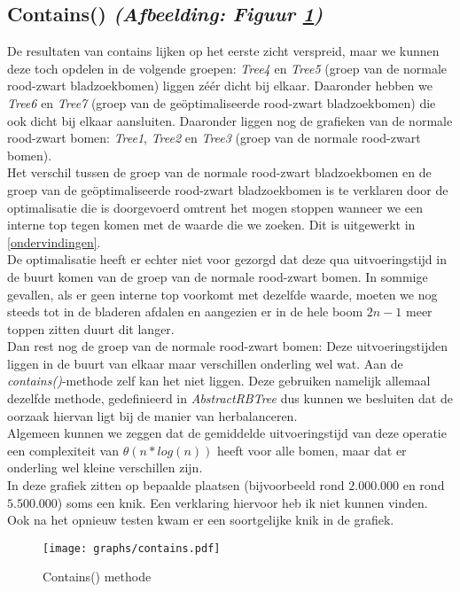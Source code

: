 \documentclass[11pt,a4paper]{report}
\begin{document}
\subsection{Contains() \textsl{(Afbeelding: Figuur \ref{contains})}}
De resultaten van contains lijken op het eerste zicht verspreid, maar we kunnen deze toch opdelen in de volgende groepen: \textsl{Tree4} en \textsl{Tree5} (groep van de normale rood-zwart bladzoekbomen) liggen z\'e\'er dicht bij elkaar. Daaronder hebben we \textsl{Tree6} en \textsl{Tree7} (groep van de ge\"optimaliseerde rood-zwart bladzoekbomen) die ook dicht bij elkaar aansluiten. Daaronder liggen nog de grafieken van de normale rood-zwart bomen: \textsl{Tree1}, \textsl{Tree2} en \textsl{Tree3} (groep van de normale rood-zwart bomen).\\
Het verschil tussen de groep van de normale rood-zwart bladzoekbomen en de groep van de ge\"optimaliseerde rood-zwart bladzoekbomen is te verklaren door de optimalisatie die is doorgevoerd omtrent het mogen stoppen wanneer we een interne top tegen komen met de waarde die we zoeken. Dit is uitgewerkt in \ref{ondervindingen}.\\
De optimalisatie heeft er echter niet voor gezorgd dat deze qua uitvoeringstijd in de buurt komen van de groep van de normale rood-zwart bomen. In sommige gevallen, als er geen interne top voorkomt met dezelfde waarde, moeten we nog steeds tot in de bladeren afdalen en aangezien er in de hele boom $2n-1$ meer toppen zitten duurt dit langer.\\
Dan rest nog de groep van de normale rood-zwart bomen: Deze uitvoeringstijden liggen in de buurt van elkaar maar verschillen onderling wel wat. Aan de \textsl{contains()}-methode zelf kan het niet liggen. Deze gebruiken namelijk allemaal dezelfde methode, gedefinieerd in \textsl{AbstractRBTree} dus kunnen we besluiten dat de oorzaak hiervan ligt bij de manier van herbalanceren.\\
Algemeen kunnen we zeggen dat de gemiddelde uitvoeringstijd van deze operatie een complexiteit van $\theta(n*log(n))$ heeft voor alle bomen, maar dat er onderling wel kleine verschillen zijn.\\
In deze grafiek zitten op bepaalde plaatsen (bijvoorbeeld rond $2.000.000$ en rond $5.500.000$) soms een knik. Een verklaring hiervoor heb ik niet kunnen vinden. Ook na het opnieuw testen kwam er een soortgelijke knik in de grafiek.
\begin{figure}[h!]
	\texttt{[image: graphs/contains.pdf]}
	\caption{Contains() methode}
	\label{contains}
\end{figure}
 
\end{document}
